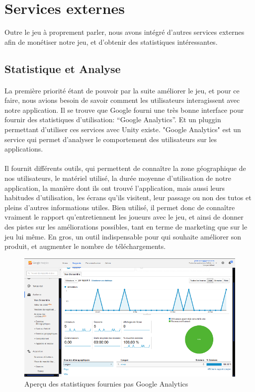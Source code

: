 \section{Services externes}
Outre le jeu à proprement parler, nous avons intégré d'autres services externes afin de monétiser notre jeu, et d'obtenir des statistiques intéressantes.

\subsection{Statistique et Analyse}

\paragraph{}
La première priorité étant de pouvoir par la suite améliorer le jeu, et pour ce faire, nous avions besoin de savoir comment les utilisateurs interagissent avec notre application. Il se trouve que Google fourni une très bonne interface pour fournir des statistiques d'utilisation: “Google Analytics”. Et un pluggin permettant d'utiliser ces services avec Unity existe. "Google Analytics" est un service qui permet d'analyser le comportement des utilisateurs sur les applications. 

\paragraph{}Il fournit différents outils, qui permettent de connaître la zone géographique de nos utilisateurs, le matériel utilisé, la durée moyenne d'utilisation de notre application, la manière dont ils ont trouvé l'application, mais aussi leurs habitudes d'utilisation, les écrans qu'ils visitent, leur passage ou non des tutos et pleins d'autres informations utiles. Bien utilisé, il permet donc de connaître vraiment le rapport qu'entretiennent les joueurs avec le jeu, et ainsi de donner des pistes sur les améliorations possibles, tant en terme de marketing que sur le jeu lui même. En gros, un outil indispensable pour qui souhaite améliorer son produit, et augmenter le nombre de téléchargements.

\begin{figure}[H]\centering
  \includegraphics[scale=0.7]{./img/GoogleAnalytics.png}
  \caption{Aperçu des statistiques fournies pas Google Analytics}
  \label{analytics}
\end{figure}


